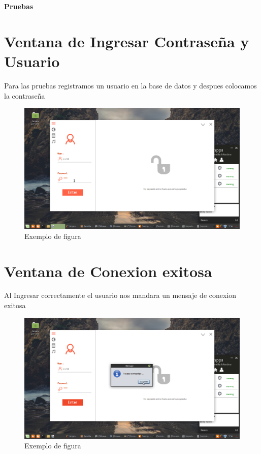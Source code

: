 \documentclass[10pt,a4paper]{report}
\begin{document}
\begin{titlepage}
\begin{flushleft}
 {\Large\bfseries \center  Pruebas  \par}
\section{Ventana de Ingresar Contraseña y Usuario}
Para las pruebas registramos un usuario en la base de datos y despues colocamos la contraseña
\begin{figure}[ht]
\centering
\includegraphics[width=1\textwidth]{17.png}
\caption{Exemplo de figura}
\label{fig:figura1}
\end{figure}
\section{Ventana de Conexion exitosa}
Al Ingresar correctamente el usuario nos mandara un mensaje de conexion exitosa \par
\begin{figure}[ht]
\centering
\includegraphics[width=1\textwidth]{18.png}
\caption{Exemplo de figura}
\label{fig:figura1}
\end{figure}
	
\end{flushleft} 
\end{titlepage}
\end{document}
